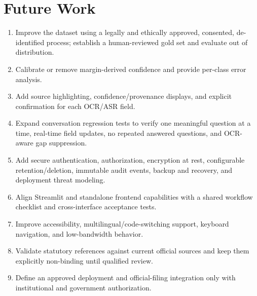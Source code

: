\documentclass[12pt,a4paper,oneside]{report}
\begin{document}
\section{Future Work}
\begin{enumerate}
\item Improve the dataset using a legally and ethically approved, consented, de-identified process; establish a human-reviewed gold set and evaluate out of distribution.
\item Calibrate or remove margin-derived confidence and provide per-class error analysis.
\item Add source highlighting, confidence/provenance displays, and explicit confirmation for each OCR/ASR field.
\item Expand conversation regression tests to verify one meaningful question at a time, real-time field updates, no repeated answered questions, and OCR-aware gap suppression.
\item Add secure authentication, authorization, encryption at rest, configurable retention/deletion, immutable audit events, backup and recovery, and deployment threat modeling.
\item Align Streamlit and standalone frontend capabilities with a shared workflow checklist and cross-interface acceptance tests.
\item Improve accessibility, multilingual/code-switching support, keyboard navigation, and low-bandwidth behavior.
\item Validate statutory references against current official sources and keep them explicitly non-binding until qualified review.
\item Define an approved deployment and official-filing integration only with institutional and government authorization.
\end{enumerate}
\end{document}
